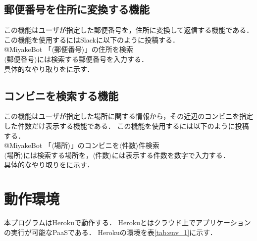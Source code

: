 \documentclass[12pt]{jsarticle}
\begin{document}


\subsection{郵便番号を住所に変換する機能}
この機能はユーザが指定した郵便番号を，住所に変換して返信する機能である．
この機能を使用するにはSlackに以下のように投稿する．\\
@MiyakeBot 「$\langle$郵便番号$\rangle$」の住所を検索\\
$\langle$郵便番号$\rangle$には検索する郵便番号を入力する．\\
具体的なやり取りをに示す．



\subsection{コンビニを検索する機能}
この機能はユーザが指定した場所に関する情報から，その近辺のコンビニを指定した件数だけ表示する機能である．
この機能を使用するには以下のように投稿する．\\
@MiyakeBot 「$\langle$場所$\rangle$」のコンビニを$\langle$件数$\rangle$件検索\\
$\langle$場所$\rangle$には検索する場所を，$\langle$件数$\rangle$には表示する件数を数字で入力する．\\
具体的なやり取りをに示す．



\section{動作環境}\label{sec:envi}
本プログラムはHerokuで動作する．
Herokuとはクラウド上でアプリケーションの実行が可能なPaaSである．
Herokuの環境を表\ref{tab:env_1}に示す．
\end{document}
